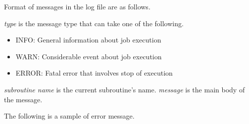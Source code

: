 Format of messages in the log file are as follows.


{\it type} is the message type that can take one of the following.
\begin{itemize}
 \item INFO: General information about job execution
 \item WARN: Considerable event about job execution
 \item ERROR: Fatal error that involves stop of execution
\end{itemize}
{\it subroutine name} is the current subroutine's name.
{\it message} is the main body of the message.

The following is a sample of error message.


